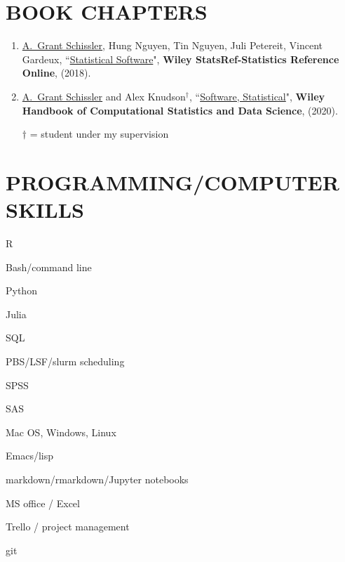 \documentclass[paper=a4,fontsize=11pt]{scrartcl} %
\newcommand{\NewPart}[2]{\section*{\uppercase{#1} #2 }}
\newcommand{\PaperEntry}[7]{
		\noindent #1, ``\href{#7}{#2}", \textit{#3} \textbf{#4}, #5 (#6).}
\begin{document}
\NewPart{Book chapters}{}
\vspace{-7pt}
\begin{enumerate}


 \item \PaperEntry{\underline{A.~Grant Schissler}, Hung Nguyen, Tin Nguyen, Juli Petereit, Vincent Gardeux}{Statistical Software}{}{Wiley StatsRef-Statistics Reference Online}{}{2018}{}

\item \PaperEntry{\underline{A.~Grant Schissler} and Alex Knudson$^{\dagger}$}{Software, Statistical}{}{Wiley Handbook of Computational Statistics and Data Science}{}{2020}{}

  $\dagger$ = student under my supervision
   
\end{enumerate}

\clearpage
\NewPart{Programming/Computer Skills}{}
\vspace{-7pt}

\begin{itemize}[noitemsep]
  \begin{multicols}{2}
\item R
\item Bash/command line
\item Python
\item Julia
\item SQL
\item PBS/LSF/slurm scheduling
\item SPSS
\item SAS
\item Mac OS, Windows, Linux
\item Emacs/lisp
\item markdown/rmarkdown/Jupyter notebooks
\item MS office / Excel
\item Trello / project management
  \item git
  \end{multicols}
\end{itemize}
\end{document}
